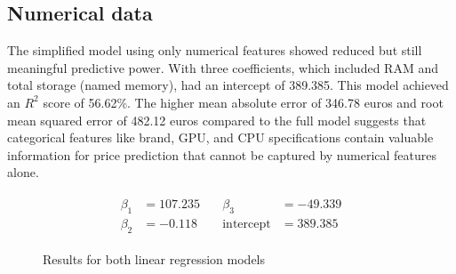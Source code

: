 \documentclass{article}
\begin{document}
\subsection{Numerical data}

The simplified model using only numerical features showed reduced but still meaningful predictive power. With three coefficients, which included RAM and total storage (named memory), had an intercept of 389.385. This model achieved an $R^2$ score of 56.62\%. The higher mean absolute error of 346.78 euros and root mean squared error of 482.12 euros compared to the full model suggests that categorical features like brand, GPU, and CPU specifications contain valuable information for price prediction that cannot be captured by numerical features alone.

\begin{align*}
\begin{split}
\beta_1 &= 107.235 \quad & \beta_3 &= -49.339 \\
\beta_2 &= -0.118 \quad & \text{intercept} &= 389.385
\end{split}
\end{align*}

\begin{figure}[!h]
    \centering
    \caption{Results for both linear regression models}
    \label{fig:model-comparison}
\end{figure}
\end{document}
